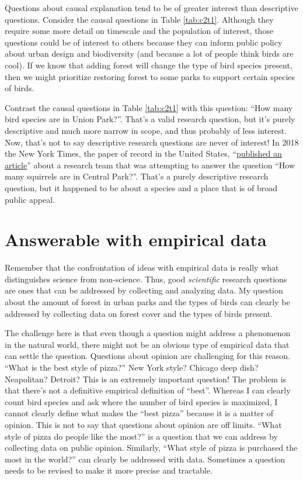 \documentclass[
]{book}
\begin{document}
Questions about causal explanation tend to be of greater interest than descriptive questions. Consider the causal questions in Table \ref{tab:c2t1}. Although they require some more detail on timescale and the population of interest, those questions could be of interest to others because they can inform public policy about urban design and biodiversity (and because a lot of people think birds are cool). If we know that adding forest will change the type of bird species present, then we might prioritize restoring forest to some parks to support certain species of birds.

Contrast the causal questions in Table \ref{tab:c2t1} with this question: ``How many bird species are in Union Park?''. That's a valid research question, but it's purely descriptive and much more narrow in scope, and thus probably of less interest. Now, that's not to say descriptive research questions are never of interest! In 2018 the New York Times, the paper of record in the United States, ``\href{https://www.nytimes.com/2018/10/06/nyregion/squirrels-central-park.html}{published an article}'' about a research team that was attempting to answer the question ``How many squirrels are in Central Park?''. That's a purely descriptive research question, but it happened to be about a species and a place that is of broad public appeal.

\section{Answerable with empirical data}\label{answerable-with-empirical-data}

Remember that the confrontation of ideas with empirical data is really what distinguishes science from non-science. Thus, good \emph{scientific} research questions are ones that can be addressed by collecting and analyzing data. My question about the amount of forest in urban parks and the types of birds can clearly be addressed by collecting data on forest cover and the types of birds present.

The challenge here is that even though a question might address a phenomenon in the natural world, there might not be an obvious type of empirical data that can settle the question. Questions about opinion are challenging for this reason. ``What is the best style of pizza?'' New York style? Chicago deep dish? Neapolitan? Detroit? This is an extremely important question! The problem is that there's not a definitive empirical definition of ``best''. Whereas I can clearly count bird species and ask where the number of bird species is maximized, I cannot clearly define what makes the ``best pizza'' because it is a matter of opinion. This is not to say that questions about opinion are off limits. ``What style of pizza do people like the most?'' is a question that we can address by collecting data on public opinion. Similarly, ``What style of pizza is purchased the most in the world?'' can clearly be addressed with data. Sometimes a question needs to be revised to make it more precise and tractable.
\end{document}

